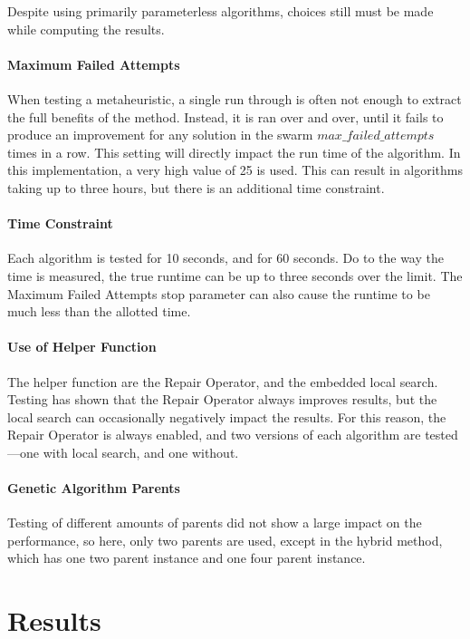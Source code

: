 \documentclass[11pt, letterpaper, onecolumn]{article}
\begin{document}
Despite using primarily parameterless algorithms, choices still must be made while computing the results. 

\paragraph{Maximum Failed Attempts}

When testing a metaheuristic, a single run through is often not enough to extract the full benefits of the method. Instead, it is ran over and over, until it fails to produce an improvement for any solution in the swarm $max\_failed\_attempts$ times in a row. This setting will directly impact the run time of the algorithm. In this implementation, a very high value of 25 is used. This can result in algorithms taking up to three hours, but there is an additional time constraint. 

\paragraph{Time Constraint}

Each algorithm is tested for 10 seconds, and for 60 seconds. Do to the way the time is measured, the true runtime can be up to three seconds over the limit. The Maximum Failed Attempts stop parameter can also cause the runtime to be much less than the allotted time. 

\paragraph{Use of Helper Function}

The helper function are the Repair Operator, and the embedded local search. Testing has shown that the Repair Operator always improves results, but the local search can occasionally negatively impact the results. For this reason, the Repair Operator is always enabled, and two versions of each algorithm are tested---one with local search, and one without. 

\paragraph{Genetic Algorithm Parents}

Testing of different amounts of parents did not show a large impact on the performance, so here, only two parents are used, except in the hybrid method, which has one two parent instance and one four parent instance. 

\section{Results}
\end{document}
